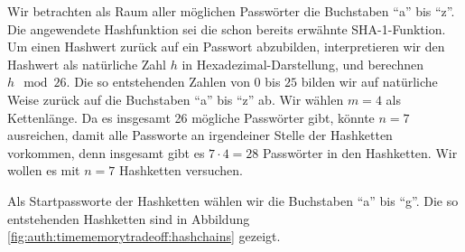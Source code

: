\begin{beispiel}
\label{ex:auth:timememorytradeoff} Wir betrachten als Raum aller
möglichen Passwörter die Buchstaben "`a"' bis "`z"'.  Die angewendete
Hashfunktion sei die schon bereits erwähnte SHA-1-Funktion.  Um einen
Hashwert zurück auf ein Passwort abzubilden, interpretieren wir den
Hashwert als natürliche Zahl $h$ in Hexadezimal-Darstellung, und
berechnen $h \mod 26$.  Die so entstehenden Zahlen von $0$ bis $25$
bilden wir auf natürliche Weise zurück auf die Buchstaben "`a"' bis
"`z"' ab.  Wir wählen $m = 4$ als Kettenlänge.  Da es insgesamt 26
mögliche Passwörter gibt, könnte $n = 7$ ausreichen, damit alle
Passworte an irgendeiner Stelle der Hashketten vorkommen, denn insgesamt
gibt es $7 \cdot 4 = 28$ Passwörter in den Hashketten.  Wir wollen es
mit $n = 7$ Hashketten versuchen.

Als Startpassworte der Hashketten wählen wir die Buchstaben "`a"' bis
"`g"'. Die so entstehenden Hashketten sind in Abbildung
\ref{fig:auth:timememorytradeoff:hashchains} gezeigt.


\end{beispiel}
